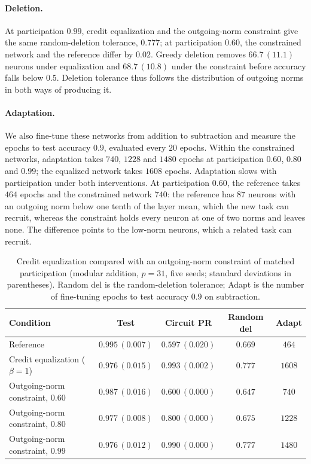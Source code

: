 \documentclass{article} %
\begin{document}
\paragraph{Deletion.} At participation $0.99$, credit equalization and the outgoing-norm constraint give the same random-deletion tolerance, $0.777$; at participation $0.60$, the constrained network and the reference differ by $0.02$. Greedy deletion removes $66.7\,(11.1)$ neurons under equalization and $68.7\,(10.8)$ under the constraint before accuracy falls below $0.5$. Deletion tolerance thus follows the distribution of outgoing norms in both ways of producing it.

\paragraph{Adaptation.} We also fine-tune these networks from addition to subtraction and measure the epochs to test accuracy $0.9$, evaluated every $20$ epochs. Within the constrained networks, adaptation takes $740$, $1228$ and $1480$ epochs at participation $0.60$, $0.80$ and $0.99$; the equalized network takes $1608$ epochs. Adaptation slows with participation under both interventions. At participation $0.60$, the reference takes $464$ epochs and the constrained network $740$: the reference has $87$ neurons with an outgoing norm below one tenth of the layer mean, which the new task can recruit, whereas the constraint holds every neuron at one of two norms and leaves none. The difference points to the low-norm neurons, which a related task can recruit.

\begin{table}[!ht]
\caption{Credit equalization compared with an outgoing-norm constraint of matched participation (modular addition, $p=31$, five seeds; standard deviations in parentheses). Random del is the random-deletion tolerance; Adapt is the number of fine-tuning epochs to test accuracy $0.9$ on subtraction.}
\label{tab:suff}
\begin{center}
\small
\begin{tabular}{lcccc}
\toprule
Condition & Test & Circuit PR & Random del & Adapt \\
\midrule
Reference            & $0.995\,(0.007)$ & $0.597\,(0.020)$ & $0.669$ & $464$ \\
Credit equalization ($\beta{=}1$)   & $0.976\,(0.015)$ & $0.993\,(0.002)$ & $0.777$ & $1608$ \\
\midrule
Outgoing-norm constraint, $0.60$   & $0.987\,(0.016)$ & $0.600\,(0.000)$ & $0.647$ & $740$ \\
Outgoing-norm constraint, $0.80$   & $0.977\,(0.008)$ & $0.800\,(0.000)$ & $0.675$ & $1228$ \\
Outgoing-norm constraint, $0.99$   & $0.976\,(0.012)$ & $0.990\,(0.000)$ & $0.777$ & $1480$ \\
\bottomrule
\end{tabular}
\end{center}
\end{table}
\end{document}
